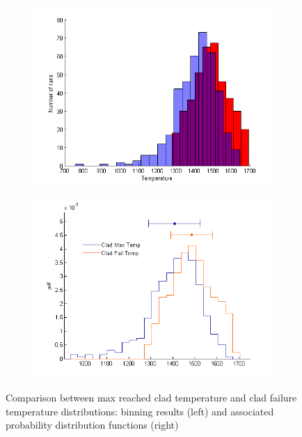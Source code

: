 \documentclass{mc2013}
\begin{document}
\begin{figure} [H]
\centering
\begin{subfigure}{.5\textwidth}
  \centering
  \includegraphics[width=1\linewidth]{figures/PRA_dist1.png}
  \label{fig:runs_temp_dist}
\end{subfigure}%
\begin{subfigure}{.5\textwidth}
  \centering
  \includegraphics[width=1\linewidth]{figures/PRA_dist2.png}
  \label{fig:pdf_temp}
\end{subfigure}
\caption{Comparison between max reached clad temperature and clad failure temperature distributions: binning results (left) and associated probability distribution functions (right)}
\label{fig:distributionResults}
\end{figure}
\end{document}
